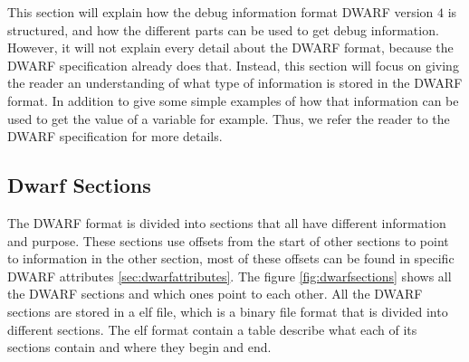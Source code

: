 

This section will explain how the debug information format \acrfull{DWARF} version $4$ is structured, and how the different parts can be used to get debug information.
However, it will not explain every detail about the \gls{DWARF} format, because the \gls{DWARF} specification already does that.
Instead, this section will focus on giving the reader an understanding of what type of information is stored in the \gls{DWARF} format.
In addition to give some simple examples of how that information can be used to get the value of a variable for example.
Thus, we refer the reader to the \gls{DWARF} specification \cite{dwarf} for more details.


\subsection{Dwarf Sections}
 


The \gls{DWARF} format is divided into sections that all have different information and purpose.
These sections use offsets from the start of other sections to point to information in the other section, most of these offsets can be found in specific \gls{DWARF} attributes \ref{sec:dwarfattributes}.
The figure \ref{fig:dwarfsections} shows all the \gls{DWARF} sections and which ones point to each other.
All the \gls{DWARF} sections are stored in a \gls{elf} file, which is a binary file format that is divided into different sections.
The \gls{elf} format contain a table describe what each of its sections contain and where they begin and end.


